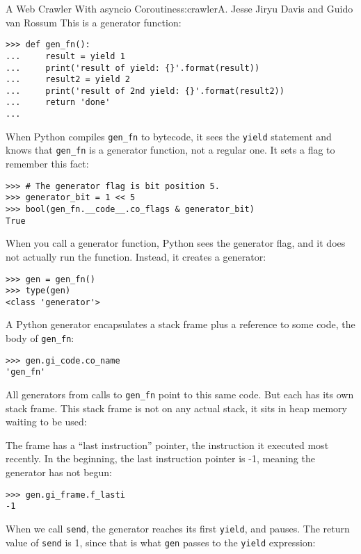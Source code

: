 \begin{aosachapter}{A Web Crawler With asyncio Coroutines}{s:crawler}{A. Jesse Jiryu Davis and Guido van Rossum}
This is a generator function:

\begin{verbatim}
>>> def gen_fn():
...     result = yield 1
...     print('result of yield: {}'.format(result))
...     result2 = yield 2
...     print('result of 2nd yield: {}'.format(result2))
...     return 'done'
...     
\end{verbatim}

When Python compiles \texttt{gen\_fn} to bytecode, it sees the
\texttt{yield} statement and knows that \texttt{gen\_fn} is a generator
function, not a regular one. It sets a flag to remember this fact:

\begin{verbatim}
>>> # The generator flag is bit position 5.
>>> generator_bit = 1 << 5
>>> bool(gen_fn.__code__.co_flags & generator_bit)
True
\end{verbatim}

When you call a generator function, Python sees the generator flag, and
it does not actually run the function. Instead, it creates a generator:

\begin{verbatim}
>>> gen = gen_fn()
>>> type(gen)
<class 'generator'>
\end{verbatim}

A Python generator encapsulates a stack frame plus a reference to some
code, the body of \texttt{gen\_fn}:

\begin{verbatim}
>>> gen.gi_code.co_name
'gen_fn'
\end{verbatim}

All generators from calls to \texttt{gen\_fn} point to this same code.
But each has its own stack frame. This stack frame is not on any actual
stack, it sits in heap memory waiting to be used:


The frame has a ``last instruction'' pointer, the instruction it
executed most recently. In the beginning, the last instruction pointer
is -1, meaning the generator has not begun:

\begin{verbatim}
>>> gen.gi_frame.f_lasti
-1
\end{verbatim}

When we call \texttt{send}, the generator reaches its first
\texttt{yield}, and pauses. The return value of \texttt{send} is 1,
since that is what \texttt{gen} passes to the \texttt{yield} expression:


\end{aosachapter}
